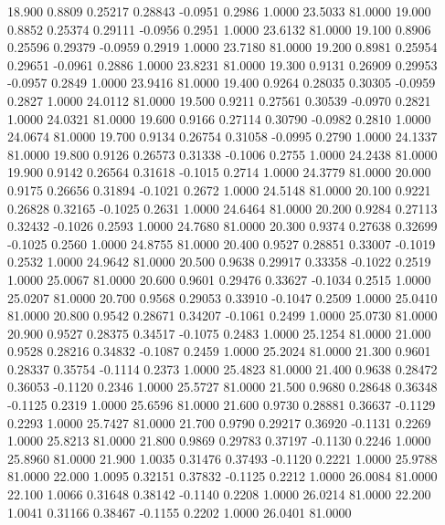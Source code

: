   18.900   0.8809   0.25217   0.28843  -0.0951   0.2986   1.0000  23.5033  81.0000
  19.000   0.8852   0.25374   0.29111  -0.0956   0.2951   1.0000  23.6132  81.0000
  19.100   0.8906   0.25596   0.29379  -0.0959   0.2919   1.0000  23.7180  81.0000
  19.200   0.8981   0.25954   0.29651  -0.0961   0.2886   1.0000  23.8231  81.0000
  19.300   0.9131   0.26909   0.29953  -0.0957   0.2849   1.0000  23.9416  81.0000
  19.400   0.9264   0.28035   0.30305  -0.0959   0.2827   1.0000  24.0112  81.0000
  19.500   0.9211   0.27561   0.30539  -0.0970   0.2821   1.0000  24.0321  81.0000
  19.600   0.9166   0.27114   0.30790  -0.0982   0.2810   1.0000  24.0674  81.0000
  19.700   0.9134   0.26754   0.31058  -0.0995   0.2790   1.0000  24.1337  81.0000
  19.800   0.9126   0.26573   0.31338  -0.1006   0.2755   1.0000  24.2438  81.0000
  19.900   0.9142   0.26564   0.31618  -0.1015   0.2714   1.0000  24.3779  81.0000
  20.000   0.9175   0.26656   0.31894  -0.1021   0.2672   1.0000  24.5148  81.0000
  20.100   0.9221   0.26828   0.32165  -0.1025   0.2631   1.0000  24.6464  81.0000
  20.200   0.9284   0.27113   0.32432  -0.1026   0.2593   1.0000  24.7680  81.0000
  20.300   0.9374   0.27638   0.32699  -0.1025   0.2560   1.0000  24.8755  81.0000
  20.400   0.9527   0.28851   0.33007  -0.1019   0.2532   1.0000  24.9642  81.0000
  20.500   0.9638   0.29917   0.33358  -0.1022   0.2519   1.0000  25.0067  81.0000
  20.600   0.9601   0.29476   0.33627  -0.1034   0.2515   1.0000  25.0207  81.0000
  20.700   0.9568   0.29053   0.33910  -0.1047   0.2509   1.0000  25.0410  81.0000
  20.800   0.9542   0.28671   0.34207  -0.1061   0.2499   1.0000  25.0730  81.0000
  20.900   0.9527   0.28375   0.34517  -0.1075   0.2483   1.0000  25.1254  81.0000
  21.000   0.9528   0.28216   0.34832  -0.1087   0.2459   1.0000  25.2024  81.0000
  21.300   0.9601   0.28337   0.35754  -0.1114   0.2373   1.0000  25.4823  81.0000
  21.400   0.9638   0.28472   0.36053  -0.1120   0.2346   1.0000  25.5727  81.0000
  21.500   0.9680   0.28648   0.36348  -0.1125   0.2319   1.0000  25.6596  81.0000
  21.600   0.9730   0.28881   0.36637  -0.1129   0.2293   1.0000  25.7427  81.0000
  21.700   0.9790   0.29217   0.36920  -0.1131   0.2269   1.0000  25.8213  81.0000
  21.800   0.9869   0.29783   0.37197  -0.1130   0.2246   1.0000  25.8960  81.0000
  21.900   1.0035   0.31476   0.37493  -0.1120   0.2221   1.0000  25.9788  81.0000
  22.000   1.0095   0.32151   0.37832  -0.1125   0.2212   1.0000  26.0084  81.0000
  22.100   1.0066   0.31648   0.38142  -0.1140   0.2208   1.0000  26.0214  81.0000
  22.200   1.0041   0.31166   0.38467  -0.1155   0.2202   1.0000  26.0401  81.0000

